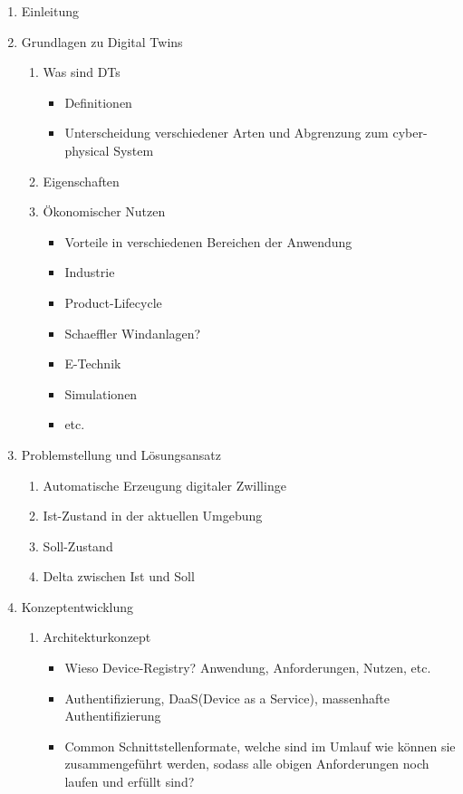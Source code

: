 \documentclass[
	12pt,
	BCOR=5mm,
	DIV=12,
	headinclude=on,
	footinclude=off,
	parskip=half,
	bibliography=totoc,
	listof=entryprefix,
	toc=listof,
	numbers=noenddot,
	plainfootsepline
]{scrreprt}
\begin{document}
\begin{enumerate}
	\item Einleitung
	\item Grundlagen zu Digital Twins
	\begin{enumerate}
		\item Was sind DTs
		\begin{itemize}
			\item Definitionen \autocite[\ppno~108953]{fuller2020digital}
			\item Unterscheidung verschiedener Arten und Abgrenzung zum cyber-physical System
		\end{itemize}
		\item Eigenschaften
		\item Ökonomischer Nutzen
		\begin{itemize}
			\item Vorteile in verschiedenen Bereichen der Anwendung
			\item Industrie
			\item Product-Lifecycle
			\item Schaeffler Windanlagen?
			\item E-Technik
			\item Simulationen
			\item etc.
		\end{itemize}
	\end{enumerate}
	\item Problemstellung und Lösungsansatz
	\begin{enumerate}
		\item Automatische Erzeugung digitaler Zwillinge
		\item Ist-Zustand in der aktuellen Umgebung
		\item Soll-Zustand
		\item Delta zwischen Ist und Soll
	\end{enumerate}
	\item Konzeptentwicklung
	\begin{enumerate}
		\item Architekturkonzept
		\begin{itemize}
			\item Wieso Device-Registry? Anwendung, Anforderungen, Nutzen, etc.
			\item Authentifizierung, DaaS(Device as a Service), massenhafte Authentifizierung
			\item Common Schnittstellenformate, welche sind im Umlauf wie können sie zusammengeführt werden, sodass alle obigen Anforderungen noch laufen und erfüllt sind?

\end{itemize}
\end{enumerate}
\end{enumerate}
\end{document}
